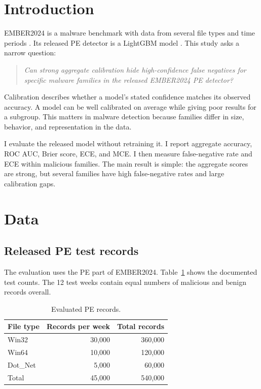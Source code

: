 \documentclass[11pt]{article}
\begin{document}
\section{Introduction}

EMBER2024 is a malware benchmark with data from several file types and time
periods \cite{joyce2025ember}. Its released PE detector is a LightGBM model
\cite{ke2017lightgbm}. This study asks a narrow question:

\begin{quote}
\itshape Can strong aggregate calibration hide high-confidence false negatives
for specific malware families in the released EMBER2024 PE detector?
\end{quote}

Calibration describes whether a model's stated confidence matches its observed
accuracy. A model can be well calibrated on average while giving poor results
for a subgroup. This matters in malware detection because families differ in
size, behavior, and representation in the data.

I evaluate the released model without retraining it. I report aggregate
accuracy, ROC AUC, Brier score, ECE, and MCE. I then measure false-negative rate
and ECE within malicious families. The main result is simple: the aggregate
scores are strong, but several families have high false-negative rates and
large calibration gaps.

\section{Data}

\subsection{Released PE test records}

The evaluation uses the PE part of EMBER2024. Table~\ref{tab:data} shows the
documented test counts. The 12 test weeks contain equal numbers of malicious
and benign records overall.

\begin{table}[!htbp]
\centering
\caption{Evaluated PE records.}
\label{tab:data}
\begin{tabular}{lrr}
\toprule
File type & Records per week & Total records \\
\midrule
Win32 & 30,000 & 360,000 \\
Win64 & 10,000 & 120,000 \\
Dot\_Net & 5,000 & 60,000 \\
\midrule
Total & 45,000 & 540,000 \\
\bottomrule
\end{tabular}
\end{table}
\end{document}
